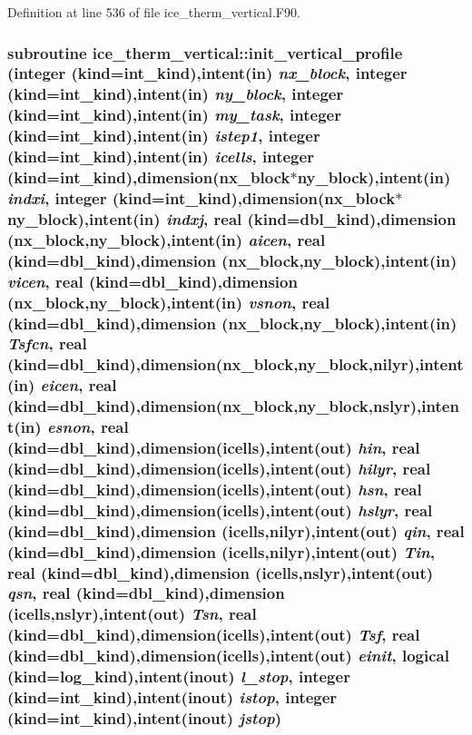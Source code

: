 Definition at line 536 of file ice\_\-therm\_\-vertical.F90.\hypertarget{namespaceice__therm__vertical_a9e8915673a763c6533b1bf688775f02c}{
\subsubsection[{init\_\-vertical\_\-profile}]{\setlength{\rightskip}{0pt plus 5cm}subroutine ice\_\-therm\_\-vertical::init\_\-vertical\_\-profile (integer (kind=int\_\-kind),intent(in) {\em nx\_\-block}, \/  integer (kind=int\_\-kind),intent(in) {\em ny\_\-block}, \/  integer (kind=int\_\-kind),intent(in) {\em my\_\-task}, \/  integer (kind=int\_\-kind),intent(in) {\em istep1}, \/  integer (kind=int\_\-kind),intent(in) {\em icells}, \/  integer (kind=int\_\-kind),dimension(nx\_\-block$\ast$ny\_\-block),intent(in) {\em indxi}, \/  integer (kind=int\_\-kind),dimension(nx\_\-block$\ast$ny\_\-block),intent(in) {\em indxj}, \/  real (kind=dbl\_\-kind),dimension (nx\_\-block,ny\_\-block),intent(in) {\em aicen}, \/  real (kind=dbl\_\-kind),dimension (nx\_\-block,ny\_\-block),intent(in) {\em vicen}, \/  real (kind=dbl\_\-kind),dimension (nx\_\-block,ny\_\-block),intent(in) {\em vsnon}, \/  real (kind=dbl\_\-kind),dimension (nx\_\-block,ny\_\-block),intent(in) {\em Tsfcn}, \/  real (kind=dbl\_\-kind),dimension(nx\_\-block,ny\_\-block,nilyr),intent(in) {\em eicen}, \/  real (kind=dbl\_\-kind),dimension(nx\_\-block,ny\_\-block,nslyr),intent(in) {\em esnon}, \/  real (kind=dbl\_\-kind),dimension(icells),intent(out) {\em hin}, \/  real (kind=dbl\_\-kind),dimension(icells),intent(out) {\em hilyr}, \/  real (kind=dbl\_\-kind),dimension(icells),intent(out) {\em hsn}, \/  real (kind=dbl\_\-kind),dimension(icells),intent(out) {\em hslyr}, \/  real (kind=dbl\_\-kind),dimension (icells,nilyr),intent(out) {\em qin}, \/  real (kind=dbl\_\-kind),dimension (icells,nilyr),intent(out) {\em Tin}, \/  real (kind=dbl\_\-kind),dimension (icells,nslyr),intent(out) {\em qsn}, \/  real (kind=dbl\_\-kind),dimension (icells,nslyr),intent(out) {\em Tsn}, \/  real (kind=dbl\_\-kind),dimension(icells),intent(out) {\em Tsf}, \/  real (kind=dbl\_\-kind),dimension(icells),intent(out) {\em einit}, \/  logical (kind=log\_\-kind),intent(inout) {\em l\_\-stop}, \/  integer (kind=int\_\-kind),intent(inout) {\em istop}, \/  integer (kind=int\_\-kind),intent(inout) {\em jstop})}}
\label{namespaceice__therm__vertical_a9e8915673a763c6533b1bf688775f02c}



